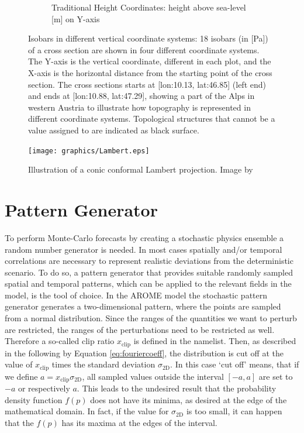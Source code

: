 \begin{figure}[H]
\begin{subfigure}{0.45\textwidth}
    \caption{\footnotesize{Traditional Height Coordinates: height above sea-level [m] on Y-axis}}
    \label{fig:PvsA}
    \end{subfigure}
    \caption[Comparison of Vertical Coordinate Systems]{Isobars in different vertical coordinate systems: 18 isobars (in [Pa]) of a cross section are shown in four different coordinate systems. The Y-axis is the vertical coordinate, different in each plot, and the X-axis is the horizontal distance from the starting point of the cross section. The cross sections starts at [lon:10.13, lat:46.85] (left end)  and ends at [lon:10.88, lat:47.29], showing a part of the Alps in western Austria to illustrate how topography is represented in different coordinate systems. Topological structures that cannot be a value assigned to are indicated as black surface.}
    \label{fig:coordinates}
\end{figure}

\begin{figure}[p]
    \centering
    \texttt{[image: graphics/Lambert.eps]}
    \caption[Lambert Projection]{Illustration of a conic conformal Lambert projection. Image by \citeauthor{usgs} \cite{usgs}}
    \label{fig:lambert}
\end{figure}
\newpage
\section{Pattern Generator}
\label{sec:pattern gen}
To perform Monte-Carlo forecasts by creating a stochastic physics ensemble a random number generator is needed. In most cases spatially and/or temporal correlations are necessary to represent realistic deviations from the deterministic scenario. To do so, a pattern generator that provides suitable randomly sampled spatial and temporal patterns, which can be applied to the relevant fields in the model, is the tool of choice.
In the AROME model the stochastic pattern generator generates a two-dimensional pattern, where the points are sampled from a normal distribution. Since the ranges of the quantities we want to perturb are restricted, the ranges of the perturbations need to be restricted as well.
Therefore a so-called clip ratio $x_{\mathrm{clip}}$ is defined in the namelist. Then, as described in the following by Equation \eqref{eq:fouriercoeff}, the distribution is cut off at the value of $x_{\mathrm{clip}}$ times the standard deviation $\sigma_{\mathrm{2D}}$. In this case `cut off' means, that if we define $a=x_{\mathrm{clip}} \sigma_{\mathrm{2D}}$, all sampled values outside the interval $[ -a, a] $ are set to $-a$ or respectively $a$.
This leads to the undesired result that the probability density function $f(p)$ does not have its minima, as desired at the edge of the mathematical domain. In fact, if the value for  $\sigma_{\mathrm{2D}}$ is too small, it can happen that the $f(p)$ has its maxima at the edges of the interval.

